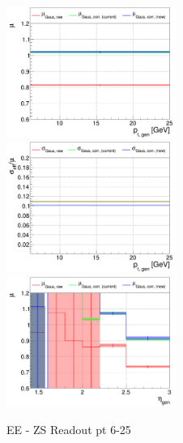 \begin{figure}
\includegraphics[width=0.495\textwidth]{./ECAL_plots/plotsPU/EE/ZS/pdf/GENPT/EEZS_GENPT_0006_0025_MuOverBins.pdf}
\includegraphics[width=0.495\textwidth]{./ECAL_plots/plotsPU/EE/ZS/pdf/GENPT/EEZS_GENPT_0006_0025_EffSigmaOverBins.pdf}
\includegraphics[width=0.495\textwidth]{./ECAL_plots/plotsPU/EE/ZS/pdf/GENETA/EEZS_GENETA_0006_0025_MuOverBins.pdf}
\caption{EE - ZS Readout pt 6-25}
\end{figure}






